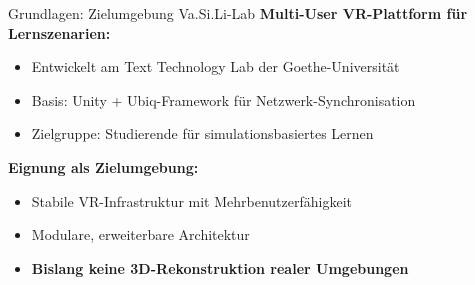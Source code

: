 
\begin{frame}{Grundlagen: Zielumgebung Va.Si.Li-Lab}{\cite{10.1145/3489849.3489871, Mehler:et:al:2023:a}}
    \textbf{Multi-User VR-Plattform für Lernszenarien:}
    \begin{itemize}
        \item Entwickelt am Text Technology Lab der Goethe-Universität
        \item Basis: Unity + Ubiq-Framework für Netzwerk-Synchronisation
        \item Zielgruppe: Studierende für simulationsbasiertes Lernen
    \end{itemize}
    
    \vfill
    
    \textbf{Eignung als Zielumgebung:}
    \begin{itemize}
        \item Stabile VR-Infrastruktur mit Mehrbenutzerfähigkeit
        \item Modulare, erweiterbare Architektur
        \item \textbf{Bislang keine 3D-Rekonstruktion realer Umgebungen}
    \end{itemize}
\end{frame}